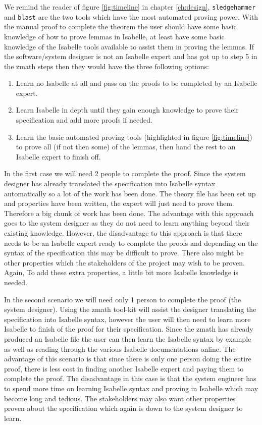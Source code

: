 We remind the reader of figure \ref{fig:timeline} in chapter \ref{ch:design},
\verb|sledgehammer| and \verb|blast| are the two tools which have the most
automated proving power. With the manual proof to complete the theorem the user
should have some basic knowledge of how to prove lemmas in Isabelle, at least
have some basic knowledge of the Isabelle tools available to assist them in
proving the lemmas. If the software/system designer is not an Isabelle expert
and has got up to step 5 in the \gls{zmath} steps then they would have the three
following options:

\begin{enumerate}
\item Learn no Isabelle at all and pass on the proofs to be completed by an
Isabelle expert.

\item Learn Isabelle in depth until they gain enough knowledge to prove their
specification and add more proofs if needed.

\item Learn the basic automated proving tools (highlighted in figure
\ref{fig:timeline}) to prove all (if not then some) of the lemmas, then hand the
rest to an Isabelle expert to finish off.
\end{enumerate}

In the first case we will need 2 people to complete the proof. Since the system
designer has already translated the specification into Isabelle syntax
automatically so a lot of the work has been done. The theory file has been set
up and properties have been written, the expert will just need to prove them.
Therefore a big chunk of work has been done. The advantage with this approach goes
to the system designer as they do not need to learn anything beyond their
existing knowledge. However, the disadvantage to this approach is that there
needs to be an Isabelle expert ready to complete the proofs and depending on the
syntax of the specification this may be difficult to prove. There also might be
other properties which the stakeholders of the project may wish to be proven.
Again, To add these extra properties, a little bit more Isabelle knowledge is
needed.

In the second scenario we will need only 1 person to complete the proof (the
system designer). Using the \gls{zmath} tool-kit will assist the designer
translating the specification into Isabelle syntax, however the user will then
need to learn more Isabelle to finish of the proof for their specification.
Since the \gls{zmath} has already produced an Isabelle file the user can then
learn the Isabelle syntax by example as well as reading through the various
Isabelle documentations online. The advantage of this scenario is that since
there is only one person doing the entire proof, there is less cost in finding
another Isabelle expert and paying them to complete the proof. The disadvantage
in this case is that the system engineer has to spend more time on learning
Isabelle syntax and proving in Isabelle which may become long and tedious. The
stakeholders may also want other properties proven about the specification which
again is down to the system designer to learn.

